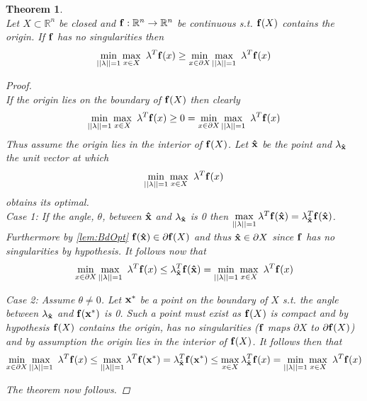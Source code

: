 \documentclass[11pt]{article}
\theoremstyle{plain}
\newtheorem{thm}{Theorem}[section]
\theoremstyle{definition}
\theoremstyle{remark}
\begin{document}
\begin{thm} \ \\
\label{thm:MainIneq}
Let $X\subset\mathbb{R}^n$ be closed and $\bold{f}:\mathbb{R}^n\rightarrow\mathbb{R}^n$ be continuous s.t. $\bold{f}(X)$ contains the origin. If $\bold{f}$ has no singularities then $$\min\limits_{||\bold{\lambda}||=1}\max\limits_{x\in X}\ \bold{\lambda}^T\bold{f}(x)\geq \min\limits_{x\in \partial X}\max\limits_{||\bold{\lambda}||=1}\ \bold{\lambda}^T\bold{f}(x)$$
\begin{proof} \ \\
If the origin lies on the boundary of $\bold{f}(X)$ then clearly $$\min\limits_{||\bold{\lambda}||=1}\max\limits_{x\in X}\ \bold{\lambda}^T\bold{f}(x)\geq 0 = \min\limits_{x\in \partial X}\max\limits_{||\bold{\lambda}||=1}\ \bold{\lambda}^T\bold{f}(x)$$
Thus assume the origin lies in the interior of $\bold{f}(X)$.
Let $\bold{\hat{x}}$ be the point and $\bold{\lambda}_{\bold{\hat{x}}}$ the unit vector at which $$\min\limits_{||\bold{\lambda}||=1}\max\limits_{x\in X}\ \bold{\lambda}^T\bold{f}(x)$$
obtains its optimal. \\

Case 1: If the angle, $\theta$, between $\bold{\hat{x}}$ and $\bold{\lambda}_{\bold{\hat{x}}}$ is 0 then $\max\limits_{||\bold{\lambda}||=1}\bold{\lambda}^T\bold{f}(\bold{\hat{x}})=\bold{\lambda}_{\bold{\hat{x}}}^T\bold{f}(\bold{\hat{x}})$. Furthermore by \cref{lem:BdOpt} $\bold{f}(\bold{\hat{x}})\in \partial \bold{f}(X)$ and thus $\bold{\hat{x}}\in \partial X$ since $\bold{f}$ has no singularities by hypothesis. It follows now that $$\min\limits_{x\in \partial X}\max\limits_{||\bold{\lambda}||=1}\ \bold{\lambda}^T\bold{f}(x)\leq \bold{\lambda}_{\bold{\hat{x}}}^T\bold{f}(\bold{\hat{x}})=\min\limits_{||\bold{\lambda}||=1}\max\limits_{x\in X}\ \bold{\lambda}^T\bold{f}(x)$$

Case 2: Assume $\theta \neq 0$. Let $\bold{x^*}$ be a point on the boundary of $X$ s.t. the angle between $\bold{\lambda}_{\bold{\hat{x}}}$ and $\bold{f}(\bold{x^*})$ is 0. Such a point must exist as $\bold{f}(X)$ is compact and by hypothesis $\bold{f}(X)$ contains the origin, has no singularities ($\bold{f}$ maps $\partial X$ to $\partial \bold{f}(X)$) and by assumption the origin lies in the interior of $\bold{f}(X)$. It follows then that $$\min\limits_{x\in \partial X}\max\limits_{||\bold{\lambda}||=1}\ \bold{\lambda}^T\bold{f}(x)\leq \max\limits_{||\bold{\lambda}||=1}\bold{\lambda}^T \bold{f}(\bold{x^*}) =\bold{\lambda}_{\bold{\hat{x}}}^T\bold{f}(\bold{x^*})\leq \max\limits_{x\in X}\bold{\lambda}_{\bold{\hat{x}}}^T\bold{f}(x)=\min\limits_{||\bold{\lambda}||=1}\max\limits_{x\in X}\ \bold{\lambda}^T\bold{f}(x)$$

The theorem now follows.

\end{proof}
\end{thm}
\ \\
\end{document}
